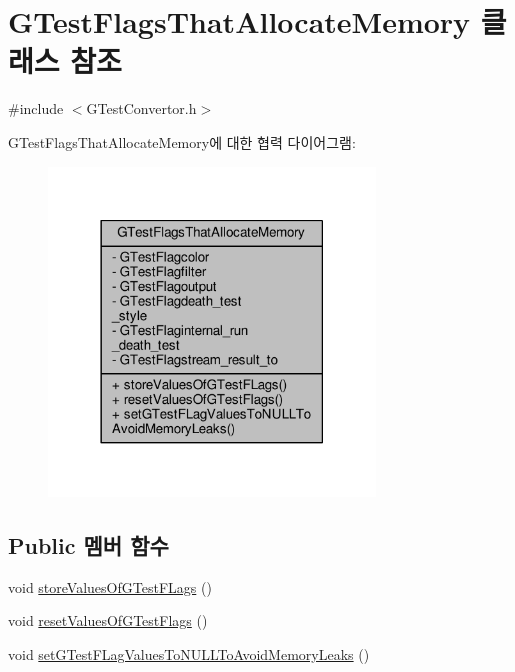 \hypertarget{class_g_test_flags_that_allocate_memory}{}\section{G\+Test\+Flags\+That\+Allocate\+Memory 클래스 참조}
\label{class_g_test_flags_that_allocate_memory}


{\ttfamily \#include $<$G\+Test\+Convertor.\+h$>$}



G\+Test\+Flags\+That\+Allocate\+Memory에 대한 협력 다이어그램\+:
\nopagebreak
\begin{figure}[H]
\begin{center}
\leavevmode
\includegraphics[width=246pt]{class_g_test_flags_that_allocate_memory__coll__graph}
\end{center}
\end{figure}
\subsection*{Public 멤버 함수}
\begin{DoxyCompactItemize}
\item 
void \hyperlink{class_g_test_flags_that_allocate_memory_abeb18e623ac60095ec42f4d94d43cc8a}{store\+Values\+Of\+G\+Test\+F\+Lags} ()
\item 
void \hyperlink{class_g_test_flags_that_allocate_memory_a28fb001d0514639d761942697dbf0ff9}{reset\+Values\+Of\+G\+Test\+Flags} ()
\item 
void \hyperlink{class_g_test_flags_that_allocate_memory_ad134bb6e901cf560fa95faa3c8389187}{set\+G\+Test\+F\+Lag\+Values\+To\+N\+U\+L\+L\+To\+Avoid\+Memory\+Leaks} ()
\end{DoxyCompactItemize}
